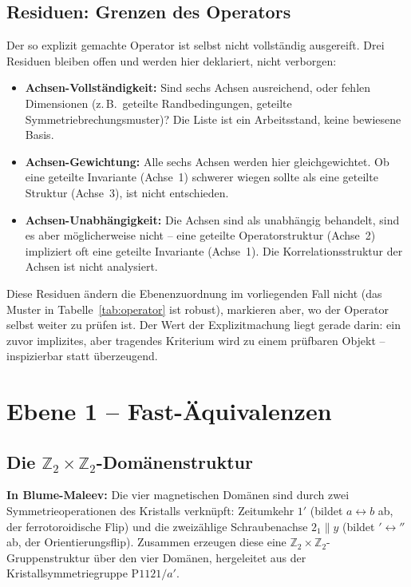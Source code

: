 \subsection{Residuen: Grenzen des Operators}

Der so explizit gemachte Operator ist selbst nicht vollständig
ausgereift. Drei Residuen bleiben offen und werden hier deklariert,
nicht verborgen:

\begin{itemize}
  \item \textbf{Achsen-Vollständigkeit:} Sind sechs Achsen ausreichend,
        oder fehlen Dimensionen (z.\,B.\ geteilte Randbedingungen,
        geteilte Symmetriebrechungsmuster)? Die Liste ist ein Arbeitsstand,
        keine bewiesene Basis.
  \item \textbf{Achsen-Gewichtung:} Alle sechs Achsen werden hier
        gleichgewichtet. Ob eine geteilte Invariante (Achse~1) schwerer
        wiegen sollte als eine geteilte Struktur (Achse~3), ist nicht
        entschieden.
  \item \textbf{Achsen-Unabhängigkeit:} Die Achsen sind als unabhängig
        behandelt, sind es aber möglicherweise nicht -- eine geteilte
        Operatorstruktur (Achse~2) impliziert oft eine geteilte Invariante
        (Achse~1). Die Korrelationsstruktur der Achsen ist nicht analysiert.
\end{itemize}

Diese Residuen ändern die Ebenenzuordnung im vorliegenden Fall nicht
(das Muster in Tabelle~\ref{tab:operator} ist robust), markieren aber,
wo der Operator selbst weiter zu prüfen ist. Der Wert der Explizitmachung
liegt gerade darin: ein zuvor implizites, aber tragendes Kriterium wird
zu einem prüfbaren Objekt -- inspizierbar statt überzeugend.

\section{Ebene 1 -- Fast-Äquivalenzen}

\subsection{Die $\mathbb{Z}_2\times\mathbb{Z}_2$-Domänenstruktur}

\textbf{In Blume-Maleev:} Die vier magnetischen Domänen sind durch zwei
Symmetrieoperationen des Kristalls verknüpft: Zeitumkehr $1'$ (bildet
$a \leftrightarrow b$ ab, der ferrotoroidische Flip) und die zweizählige
Schraubenachse $2_1\|y$ (bildet $'\leftrightarrow''$ ab, der Orientierungsflip).
Zusammen erzeugen diese eine $\mathbb{Z}_2\times\mathbb{Z}_2$-Gruppenstruktur
über den vier Domänen, hergeleitet aus der Kristallsymmetriegruppe P$1121/a'$.

